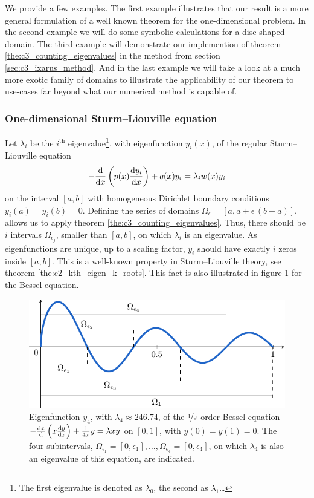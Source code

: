 We provide a few examples. The first example illustrates that our result is a more general formulation of a well known theorem for the one-dimensional problem. In the second example we will do some symbolic calculations for a disc-shaped domain. The third example will demonstrate our implemention of theorem \ref{the:c3_counting_eigenvalues} in the method from section \ref{sec:c3_ixarus_method}. And in the last example we will take a look at a much more exotic family of domains to illustrate the applicability of our theorem to use-cases far beyond what our numerical method is capable of.

\subsubsection{One-dimensional Sturm--Liouville equation}

Let $\lambda_i$ be the $i^{\text{th}}$ eigenvalue\footnote{The first eigenvalue is denoted as $\lambda_0$, the second as $\lambda_1$\dots}, with eigenfunction $y_i(x)$, of the regular Sturm--Liouville equation
$$
  -\dv{x} \left( p(x) \dv{y_i}{x} \right) + q(x) y_i = \lambda_i w(x) y_i
$$
on the interval $[a, b]$ with homogeneous Dirichlet boundary conditions $y_i(a) = y_i(b) = 0$. Defining the series of domains $\Omega_\epsilon = [a, a + \epsilon\,(b-a)]$, allows us to apply theorem \ref{the:c3_counting_eigenvalues}. Thus, there should be $i$ intervals $\Omega_{\epsilon_j}$, smaller than $[a, b]$, on which $\lambda_i$ is an eigenvalue. As eigenfunctions are unique, up to a scaling factor, $y_i$ should have exactly $i$ zeros inside $[a, b]$. This is a well-known property in Sturm--Liouville theory, see theorem \ref{the:c2_kth_eigen_k_roots}. This fact is also illustrated in figure \ref{fig:c3_counting_sturm_liouville} for the Bessel equation.

\begin{figure}
  \begin{center}
    \includegraphics[width=.9\textwidth]{img/chapter3/counting/sturm-liouville.pdf}
    \caption{Eigenfunction $y_4$, with $\lambda_4 \approx 246.74$, of the $\nicefrac{1}{2}$-order Bessel equation \cite{titchmarsh_eigenfunction_1962} $-\dv{x}{} \left( x \dv{y}{x} \right) + \frac{1}{4x} y = \lambda x y $ on $[0, 1]$, with $y(0) = y(1) = 0$. The four subintervals, $\Omega_{\epsilon_1} = [0, \epsilon_1],\dots, \Omega_{\epsilon_4} = [0, \epsilon_4]$, on which $\lambda_4$ is also an eigenvalue of this equation, are indicated.}\label{fig:c3_counting_sturm_liouville}
  \end{center}
\end{figure}

